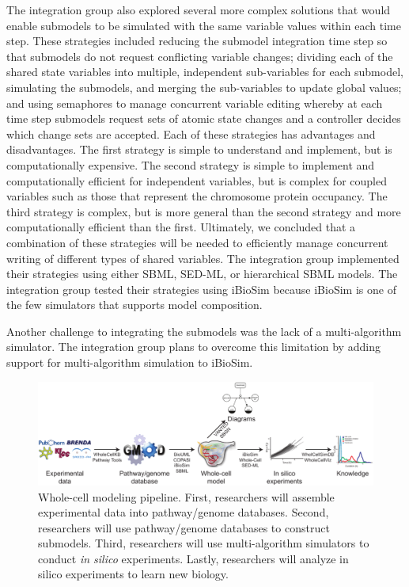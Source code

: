 \documentclass[journal,transmag]{IEEEtran}
\begin{document}
The integration group also explored several more complex solutions that would enable submodels to be simulated with the same variable values within each time step. These strategies included reducing the submodel integration time step so that submodels do not request conflicting variable changes; dividing each of the shared state variables into multiple, independent sub-variables for each submodel, simulating the submodels, and merging the sub-variables to update global values; and using semaphores to manage concurrent variable editing whereby at each time step submodels request sets of atomic state changes and a controller decides which change sets are accepted. Each of these strategies has advantages and disadvantages. The first strategy is simple to understand and implement, but is computationally expensive. The second strategy is simple to implement and computationally efficient for independent variables, but is complex for coupled variables such as those that represent the chromosome protein occupancy. The third strategy is complex, but is more general than the second strategy and more computationally efficient than the first. Ultimately, we concluded that a combination of these strategies will be needed to efficiently manage concurrent writing of different types of shared variables. The integration group implemented their strategies using either SBML, SED-ML, or hierarchical SBML models. The integration group tested their strategies using iBioSim because iBioSim is one of the few simulators that supports model composition.

Another challenge to integrating the submodels was the lack of a multi-algorithm simulator. The integration group plans to overcome this limitation by adding support for multi-algorithm simulation to iBioSim.

\begin{figure}[bt!]
\centering
\includegraphics[width=\textwidth]{figure1/figure1.pdf}
\caption{\label{fig:1} Whole-cell modeling pipeline. First, researchers will assemble experimental data into pathway/genome databases. Second, researchers will use pathway/genome databases to construct submodels. Third, researchers will use multi-algorithm simulators to conduct \textit{in silico} experiments. Lastly, researchers will analyze in silico experiments to learn new biology.}
\end{figure}
\end{document}
